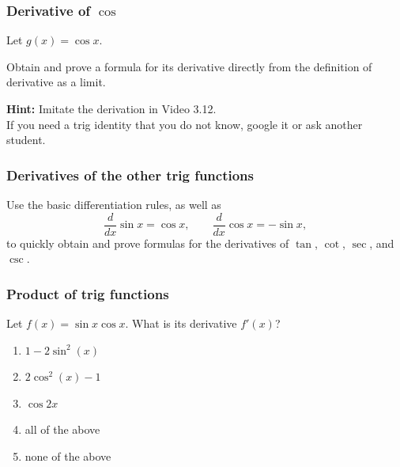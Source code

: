 \documentclass[14pt]{beamer}
\begin{document}




	\begin{frame}[t]
		\frametitle{Derivative of $\cos$}

		Let $\displaystyle g(x) = \cos x.$

		Obtain and prove a formula for its derivative directly from the definition of
		derivative as a limit.

		\vfill

		{\bfseries Hint:} Imitate the derivation in Video 3.12. \\ If you need a trig
		identity that you do not know, google it or ask another student.




	\end{frame}


	\begin{frame}[t]
		\frametitle{Derivatives of the other trig functions}

		Use the basic differentiation rules, as well as
		\[
			\frac{d}{dx}\sin x = \cos x, \quad \quad \frac{d}{dx}\cos x = - \sin x,
		\]
		to quickly obtain and prove formulas for the derivatives of $\tan$, $\cot$, $\sec$,
		and $\csc$.
	\end{frame}


	\begin{frame}
		\frametitle{Product of trig functions}

		Let $f(x)= \sin x \cos x$. What is its derivative $f'(x)$?
		\begin{enumerate}
			\item $1-2\sin^{2}(x)$

			\item $2\cos^{2}(x) -1$

			\item $\cos 2x$

			\item all of the above

			\item none of the above
		\end{enumerate}

	\end{frame}
\end{document}
